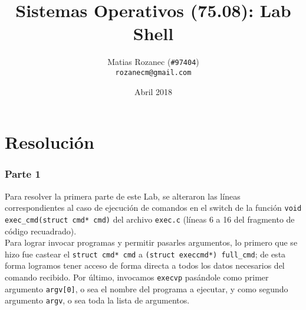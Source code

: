\documentclass{article}
\title{Sistemas Operativos (75.08): Lab Shell}
\author{Matias Rozanec (\texttt{\#97404})\\\texttt{rozanecm@gmail.com}}
\date{Abril 2018}
\begin{document}
\maketitle
\newpage

\tableofcontents
\newpage

% 

\part{Resolución}
\section{Parte 1}
Para resolver la primera parte de este Lab, se alteraron las líneas correspondientes al caso de ejecución de comandos en el switch de la función \texttt{void exec\_cmd(struct cmd* cmd)} del archivo \texttt{exec.c} (líneas 6 a 16 del fragmento de código recuadrado).\\

Para lograr invocar programas y permitir pasarles argumentos, lo primero que se hizo fue castear el \texttt{struct cmd* cmd} a \texttt{(struct execcmd*) full\_cmd}; de esta forma logramos tener acceso de forma directa a todos los datos necesarios del comando recibido. Por último, invocamos \texttt{execvp} pasándole como primer argumento \texttt{argv[0]}, o sea el nombre del programa a ejecutar, y como segundo argumento \texttt{argv}, o sea toda la lista de argumentos.\\
\end{document}
